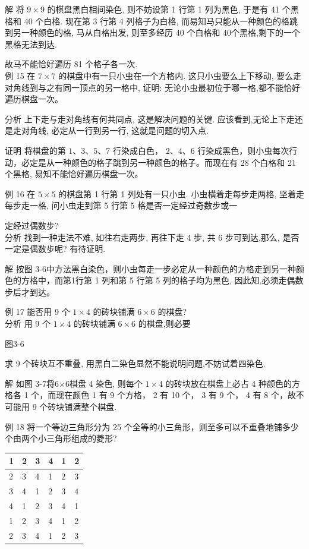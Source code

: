 \documentclass[10pt]{article}
\begin{document}
解 将 $9 \times 9$ 的棋盘黑白相间染色, 则不妨设第 1 行第 1 列为黑色, 于是有 41 个黑格和 40 个白格. 现在第 3 行第 4 列格子为白格, 而易知马只能从一种颜色的格跳到另一种颜色的格, 马从白格出发, 则至多经历 40 个白格和 40个黑格,剩下的一个黑格无法到达.

故马不能恰好遍历 81 个格子各一次.\\
例 15 在 $7 \times 7$ 的棋盘中有一只小虫在一个方格内. 这只小虫要么上下移动, 要么走对角线到与之有同一顶点的另一格中, 证明: 无论小虫最初位于哪一格,都不能恰好遍历棋盘一次。

分析 上下走与走对角线有何共同点, 这是解决问题的关键. 应该看到,无论上下走还是走对角线, 必定从一行到另一行, 这就是问题的切入点.

证明 将棋盘的第 $1 、 3 、 5 、 7$ 行染成白色， $2 、 4 、 6$ 行染成黑色，则小虫每次行动，必定是从一种颜色的格子跳到另一种颜色的格子。而现在有 28 个白格和 21 个黑格, 易知不能恰好遍历棋盘一次。

例 16 在 $5 \times 5$ 的棋盘第 1 行第 1 列处有一只小虫. 小虫横着走每步走两格, 坚着走每步走一格, 问小虫走到第 5 行第 5 格是否一定经过奇数步或一

定经过偶数步?\\
分析 找到一种走法不难, 如往右走两步, 再往下走 4 步, 共 6 步可到达,那么, 是否一定是偶数步呢? 有待证明.

解 按图 3-6中方法黑白染色，则小虫每走一步必定从一种颜色的方格走到另一种颜色的方格中，而第1行第 1 列和第 5 行第 5 列的格子均为黑色, 因此知,必须走偶数步后才到达。

例 17 能否用 9 个 $1 \times 4$ 的砖块铺满 $6 \times 6$ 的棋盘?\\
分析 用 9 个 $1 \times 4$ 的砖块铺满 $6 \times 6$ 的棋盘,则必要

图3-6

求 9 个砖块互不重叠, 用黑白二染色显然不能说明问题,不妨试着四染色.

解 如图 3-7将6×6棋盘 4 染色, 则每个 $1 \times 4$ 的砖块放在棋盘上必占 4 种颜色的方格各 1 个，而现在颜色 1 有 9 个方格， 2 有 10 个， 3 有 9 个， 4 有 8 个，故不可能用 9 个砖块铺满整个棋盘.

例 18 将一个等边三角形分为 25 个全等的小三角形，则至多可以不重叠地铺多少个由两个小三角形组成的菱形?

\begin{center}
\begin{tabular}{|l|l|l|l|l|l|}
\hline
1 & 2 & 3 & 4 & 1 & 2 \\
\hline
2 & 3 & 4 & 1 & 2 & 3 \\
\hline
3 & 4 & 1 & 2 & 3 & 4 \\
\hline
4 & 1 & 2 & 3 & 4 & 1 \\
\hline
1 & 2 & 3 & 4 & 1 & 2 \\
\hline
2 & 3 & 4 & 1 & 2 & 3 \\
\hline
\end{tabular}
\end{center}
\end{document}
